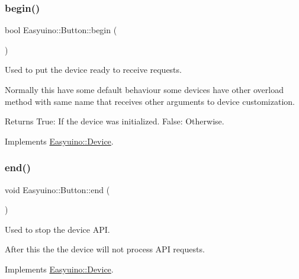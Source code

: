 \subsubsection{\texorpdfstring{begin()}{begin()}}
{\footnotesize\ttfamily bool Easyuino\+::\+Button\+::begin (\begin{DoxyParamCaption}{ }\end{DoxyParamCaption})\hspace{0.3cm}{\ttfamily [virtual]}}



Used to put the device ready to receive requests. 

Normally this have some default behaviour some devices have other overload method with same name that receives other arguments to device customization. \begin{DoxyReturn}{Returns}
True\+: If the device was initialized. False\+: Otherwise. 
\end{DoxyReturn}


Implements \hyperlink{class_easyuino_1_1_device_a2e7bb2fec849719a9d9432b57cdb72ba}{Easyuino\+::\+Device}.

\mbox{\label{class_easyuino_1_1_button_a0742235d911c24e7b3505f9655176532}} 
\subsubsection{\texorpdfstring{end()}{end()}}
{\footnotesize\ttfamily void Easyuino\+::\+Button\+::end (\begin{DoxyParamCaption}{ }\end{DoxyParamCaption})\hspace{0.3cm}{\ttfamily [virtual]}}



Used to stop the device A\+PI. 

After this the the device will not process A\+PI requests. 

Implements \hyperlink{class_easyuino_1_1_device_ab31018ef64adc84aa2ea575b2297548f}{Easyuino\+::\+Device}.

\mbox{\label{class_easyuino_1_1_button_a6c2e853db61878dc0050a782dc3eaab9}} 
